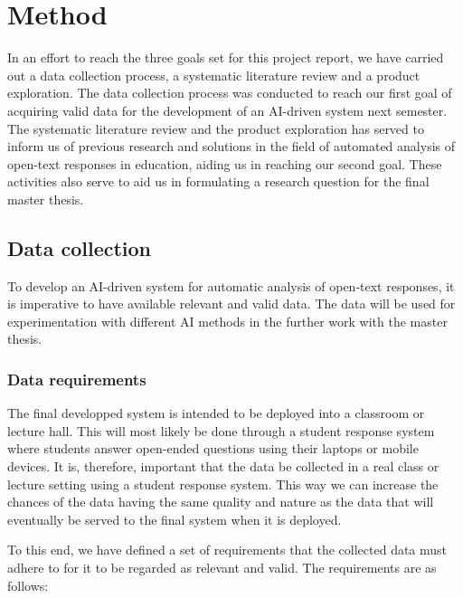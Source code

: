 \chapter{Method}\label{sec:method}

\begin{comment}
The method chapter should describe in detail which activities you undertake to answer the research questions presented in the introduction, and why they were chosen. This includes detailed descriptions of experiments, surveys, computations, data analysis, statistical tests etc.
\end{comment}

In an effort to reach the three goals set for this project report, we have carried out a data collection process, a systematic literature review and a product exploration. The data collection process was conducted to reach our first goal of acquiring valid data for the development of an AI-driven system next semester. The systematic literature review and the product exploration has served to inform us of previous research and solutions in the field of automated analysis of open-text responses in education, aiding us in reaching our second goal. These activities also serve to aid us in formulating a research question for the final master thesis.


\section{Data collection}
To develop an AI-driven system for automatic analysis of open-text responses, it is imperative to have available relevant and valid data. The data will be used for experimentation with different AI methods in the further work with the master thesis.

\subsection{Data requirements}
The final developped system is intended to be deployed into a classroom or lecture hall. This will most likely be done through a student response system where students answer open-ended questions using their laptops or mobile devices. It is, therefore, important that the data be collected in a real class or lecture setting using a student response system. This way we can increase the chances of the data having the same quality and nature as the data that will eventually be served to the final system when it is deployed.

To this end, we have defined a set of requirements that the collected data must adhere to for it to be regarded as relevant and valid. The requirements are as follows:


